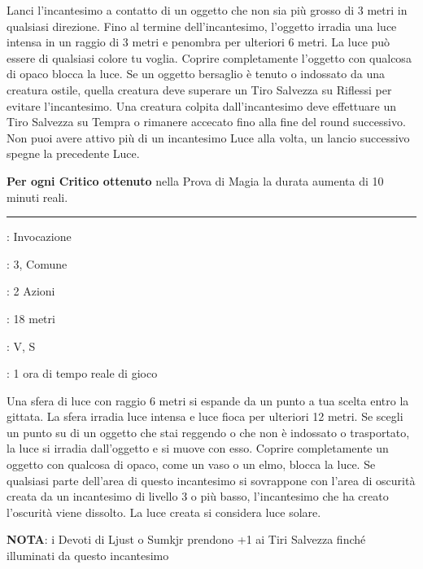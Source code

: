 \begin{multicols}{2}
Lanci l'incantesimo a contatto di un oggetto che non sia più grosso di 3 metri in qualsiasi direzione. Fino al termine dell'incantesimo, l'oggetto irradia una luce intensa in un raggio di 3 metri e penombra per ulteriori 6 metri. La luce può essere di qualsiasi colore tu voglia. Coprire completamente l'oggetto con qualcosa di opaco blocca la luce. Se un oggetto bersaglio è tenuto o indossato da una creatura ostile, quella creatura deve superare un Tiro Salvezza su Riflessi per evitare l'incantesimo. Una creatura colpita dall'incantesimo deve effettuare un Tiro Salvezza su Tempra o rimanere accecato fino alla fine del round successivo. Non puoi avere attivo più di un incantesimo Luce alla volta, un lancio successivo spegne la precedente Luce.

\textbf{Per ogni Critico ottenuto} nella Prova di Magia la durata aumenta di 10 minuti reali.

\smallskip\noindent\rule{\linewidth}{2pt} \hypertarget{Luce Diurna}{}\smallskip{}
\noindent
\begin{description}[noitemsep, topsep=0pt, parsep=0pt, partopsep=0pt, leftmargin=0cm, labelwidth=2.8cm]
	\item[\textbf{Lista di Magia}]: Invocazione
	\item[\textbf{Livello}]: 3, Comune
	\item[\textbf{T. di Lancio}]: 2 Azioni
	\item[\textbf{Gittata}]: 18 metri
	\item[\textbf{Componenti}]: V, S
	\item[\textbf{Durata}]: 1 ora di tempo reale di gioco
\end{description}

Una sfera di luce con raggio 6 metri si espande da un punto a tua scelta entro la gittata. La sfera irradia luce intensa e luce fioca per ulteriori 12 metri. Se scegli un punto su di un oggetto che stai reggendo o che non è indossato o trasportato, la luce si irradia dall'oggetto e si muove con esso. Coprire completamente un oggetto con qualcosa di opaco, come un vaso o un elmo, blocca la luce. Se qualsiasi parte dell'area di questo incantesimo si sovrappone con l'area di oscurità creata da un incantesimo di livello 3 o più basso, l'incantesimo che ha creato l'oscurità viene dissolto. La luce creata si considera luce solare.

\textbf{NOTA}: i Devoti di Ljust o Sumkjr prendono +1 ai Tiri Salvezza finché illuminati da questo incantesimo


\end{multicols}
